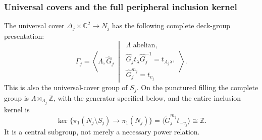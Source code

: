 \subsubsection{Universal covers and the full peripheral inclusion kernel}

\begin{theorem}
\label{wb:ffcert:thm:peripheral-kernel}
The universal cover $\Delta_j\times\mathbb C^2\to N_j$ has the
following complete deck-group presentation:
\[
 \Gamma_j=\left\langle\Lambda,\widehat G_j\ \middle|\
 \begin{array}{l}
 \Lambda\text{ abelian},\\
 \widehat G_jt_\lambda\widehat G_j^{-1}=t_{A_j\lambda},\\
 \widehat G_j^{m_j}=t_{v_j}
 \end{array}\right\rangle.
 \tag{FF30}\label{wb:ffcert:eq:full-deck-group}
\]
This is also the universal-cover group of $S_j$. On the punctured
filling the complete group is $\Lambda\rtimes_{A_j}\mathbb Z$,
with the generator specified below, and the entire inclusion kernel is
\[
 \ker\{\pi_1(N_j\setminus S_j)\to\pi_1(N_j)\}
   =\langle\widetilde G_j^{m_j}t_{-v_j}\rangle
   \cong\mathbb Z.
 \tag{FF31}\label{wb:ffcert:eq:whole-kernel}
\]
It is a central subgroup, not merely a necessary power relation.
\end{theorem}

